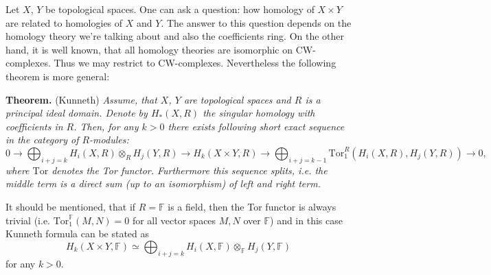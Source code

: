 \documentclass[12pt]{article}
\begin{document}
Let $X$, $Y$ be topological spaces. One can ask a question: how homology of $X\times Y$ are related to homologies of $X$ and $Y$. The answer to this question depends on the homology theory we're talking about and also the coefficients ring. On the other hand, it is well known, that all homology theories are isomorphic on CW-complexes. Thus we may restrict to CW-complexes. Nevertheless the following theorem is more general:

\textbf{Theorem.} (Kunneth) \textit{Assume, that $X$, $Y$ are topological spaces and $R$ is a principal ideal domain. Denote by $H_*(X,R)$ the singular homology with coefficients in $R$. Then, for any $k>0$ there exists following short exact sequence in the category of $R$-modules:
$$0\to \bigoplus_{i+j=k} H_i(X,R)\otimes_R H_j(Y,R)\to H_k(X\times Y,R) \to \bigoplus_{i+j=k-1}\mathrm{Tor}_1^R(H_i(X,R),H_j(Y,R))\to 0,$$
where $\mathrm{Tor}$ denotes the Tor functor. Furthermore this sequence splits, i.e. the middle term is a direct sum (up to an isomorphism) of left and right term.}

It should be mentioned, that if $R=\mathbb{F}$ is a field, then the Tor functor is always trivial (i.e. $\mathrm{Tor}^{\mathbb{F}}_1(M,N)=0$ for all vector spaces $M,N$ over $\mathbb{F}$) and in this case Kunneth formula can be stated as
$$H_k(X\times Y,\mathbb{F})\simeq \bigoplus_{i+j=k} H_i(X,\mathbb{F})\otimes_{\mathbb{F}} H_j(Y,\mathbb{F})$$
for any $k>0$.
\end{document}

